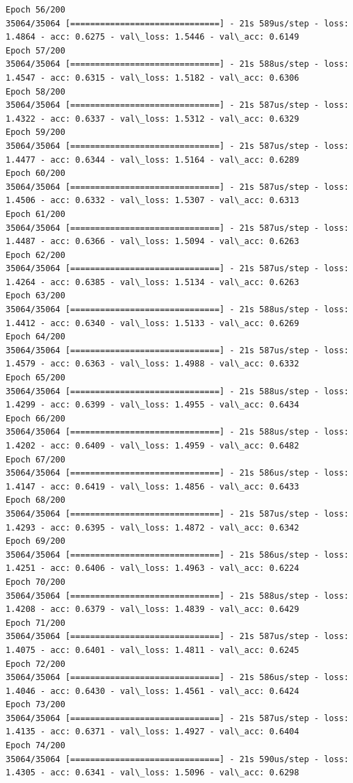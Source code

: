 \documentclass[11pt]{article}
\begin{document}
\begin{Verbatim}[commandchars=\\\{\}]
Epoch 56/200
35064/35064 [==============================] - 21s 589us/step - loss: 1.4864 - acc: 0.6275 - val\_loss: 1.5446 - val\_acc: 0.6149
Epoch 57/200
35064/35064 [==============================] - 21s 588us/step - loss: 1.4547 - acc: 0.6315 - val\_loss: 1.5182 - val\_acc: 0.6306
Epoch 58/200
35064/35064 [==============================] - 21s 587us/step - loss: 1.4322 - acc: 0.6337 - val\_loss: 1.5312 - val\_acc: 0.6329
Epoch 59/200
35064/35064 [==============================] - 21s 587us/step - loss: 1.4477 - acc: 0.6344 - val\_loss: 1.5164 - val\_acc: 0.6289
Epoch 60/200
35064/35064 [==============================] - 21s 587us/step - loss: 1.4506 - acc: 0.6332 - val\_loss: 1.5307 - val\_acc: 0.6313
Epoch 61/200
35064/35064 [==============================] - 21s 587us/step - loss: 1.4487 - acc: 0.6366 - val\_loss: 1.5094 - val\_acc: 0.6263
Epoch 62/200
35064/35064 [==============================] - 21s 587us/step - loss: 1.4264 - acc: 0.6385 - val\_loss: 1.5134 - val\_acc: 0.6263
Epoch 63/200
35064/35064 [==============================] - 21s 588us/step - loss: 1.4412 - acc: 0.6340 - val\_loss: 1.5133 - val\_acc: 0.6269
Epoch 64/200
35064/35064 [==============================] - 21s 587us/step - loss: 1.4579 - acc: 0.6363 - val\_loss: 1.4988 - val\_acc: 0.6332
Epoch 65/200
35064/35064 [==============================] - 21s 588us/step - loss: 1.4299 - acc: 0.6399 - val\_loss: 1.4955 - val\_acc: 0.6434
Epoch 66/200
35064/35064 [==============================] - 21s 588us/step - loss: 1.4202 - acc: 0.6409 - val\_loss: 1.4959 - val\_acc: 0.6482
Epoch 67/200
35064/35064 [==============================] - 21s 586us/step - loss: 1.4147 - acc: 0.6419 - val\_loss: 1.4856 - val\_acc: 0.6433
Epoch 68/200
35064/35064 [==============================] - 21s 587us/step - loss: 1.4293 - acc: 0.6395 - val\_loss: 1.4872 - val\_acc: 0.6342
Epoch 69/200
35064/35064 [==============================] - 21s 586us/step - loss: 1.4251 - acc: 0.6406 - val\_loss: 1.4963 - val\_acc: 0.6224
Epoch 70/200
35064/35064 [==============================] - 21s 588us/step - loss: 1.4208 - acc: 0.6379 - val\_loss: 1.4839 - val\_acc: 0.6429
Epoch 71/200
35064/35064 [==============================] - 21s 587us/step - loss: 1.4075 - acc: 0.6401 - val\_loss: 1.4811 - val\_acc: 0.6245
Epoch 72/200
35064/35064 [==============================] - 21s 586us/step - loss: 1.4046 - acc: 0.6430 - val\_loss: 1.4561 - val\_acc: 0.6424
Epoch 73/200
35064/35064 [==============================] - 21s 587us/step - loss: 1.4135 - acc: 0.6371 - val\_loss: 1.4927 - val\_acc: 0.6404
Epoch 74/200
35064/35064 [==============================] - 21s 590us/step - loss: 1.4305 - acc: 0.6341 - val\_loss: 1.5096 - val\_acc: 0.6298

\end{Verbatim}
\end{document}
